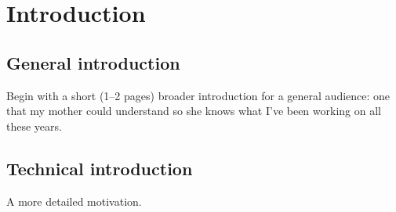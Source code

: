 \documentclass[12pt]{report}
\begin{document}
\chapter{Introduction}

\section{General introduction}
Begin with a short (1–2 pages) broader introduction for a general audience: one that my mother could understand so she knows what I’ve been working on all these years.

\section{Technical introduction}
A more detailed motivation.
\end{document}
